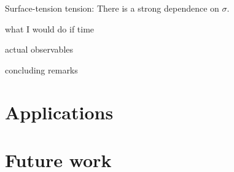 


\begin{bullets}
    \item Surface-tension tension: There is a strong dependence on $\sigma$.
    \item what I would do if time
    \item actual observables
    \item concluding remarks
\end{bullets}



\section{Applications}



\section{Future work}